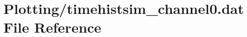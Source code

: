 \hypertarget{Plotting_2timehistsim__channel0_8dat}{}\section{Plotting/timehistsim\+\_\+channel0.dat File Reference}
\label{Plotting_2timehistsim__channel0_8dat}
